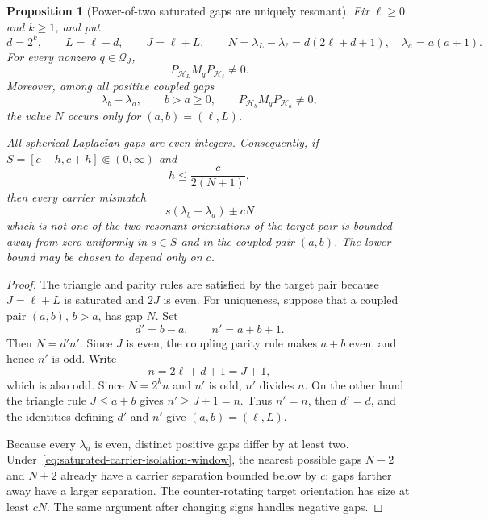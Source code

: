 \documentclass[11pt]{article}
\newtheorem{proposition}[theorem]{Proposition}
\theoremstyle{remark}
\begin{document}
\begin{proposition}[Power-of-two saturated gaps are uniquely resonant]
\label{prop:power-two-saturated-gap}
Fix $\ell\geq0$ and $k\geq1$, and put
\begin{equation}
 d=2^k,\qquad L=\ell+d,\qquad J=\ell+L,\qquad
 N=\lambda_L-\lambda_\ell=d(2\ell+d+1),
 \quad \lambda_a=a(a+1).
 \label{eq:power-two-saturated-data}
\end{equation}
For every nonzero $q\in\mathcal Q_J$,
\[
 P_{\mathcal H_L}M_qP_{\mathcal H_\ell}\neq0.
\]
Moreover, among all positive coupled gaps
\[
 \lambda_b-\lambda_a,\qquad
 b>a\geq0,\qquad
 P_{\mathcal H_b}M_qP_{\mathcal H_a}\neq0,
\]
the value $N$ occurs only for $(a,b)=(\ell,L)$.

All spherical Laplacian gaps are even integers.  Consequently, if
$S=[c-h,c+h]\Subset(0,\infty)$ and
\begin{equation}
 h\leq\frac{c}{2(N+1)},
 \label{eq:saturated-carrier-isolation-window}
\end{equation}
then every carrier mismatch
\[
 s(\lambda_b-\lambda_a)\pm cN
\]
which is not one of the two resonant orientations of the target pair is
bounded away from zero uniformly in $s\in S$ and in the coupled pair
$(a,b)$.  The lower bound may be chosen to depend only on $c$.
\end{proposition}

\begin{proof}
The triangle and parity rules are satisfied by the target pair because
$J=\ell+L$ is saturated and $2J$ is even.  For uniqueness, suppose that a
coupled pair $(a,b)$, $b>a$, has gap $N$.  Set
\[
 d'=b-a,\qquad n'=a+b+1.
\]
Then $N=d'n'$.  Since $J$ is even, the coupling parity rule makes $a+b$
even, and hence $n'$ is odd.  Write
\[
 n=2\ell+d+1=J+1,
\]
which is also odd.  Since $N=2^kn$ and $n'$ is odd, $n'$ divides $n$.
On the other hand the triangle rule $J\leq a+b$ gives
$n'\geq J+1=n$.  Thus $n'=n$, then $d'=d$, and the identities defining
$d'$ and $n'$ give $(a,b)=(\ell,L)$.

Because every $\lambda_a$ is even, distinct positive gaps differ by at
least two.  Under~\eqref{eq:saturated-carrier-isolation-window}, the nearest
possible gaps $N-2$ and $N+2$ already have a carrier separation bounded
below by $c$; gaps farther away have a larger separation.  The
counter-rotating target orientation has size at least $cN$.  The same
argument after changing signs handles negative gaps.
\end{proof}
\end{document}
